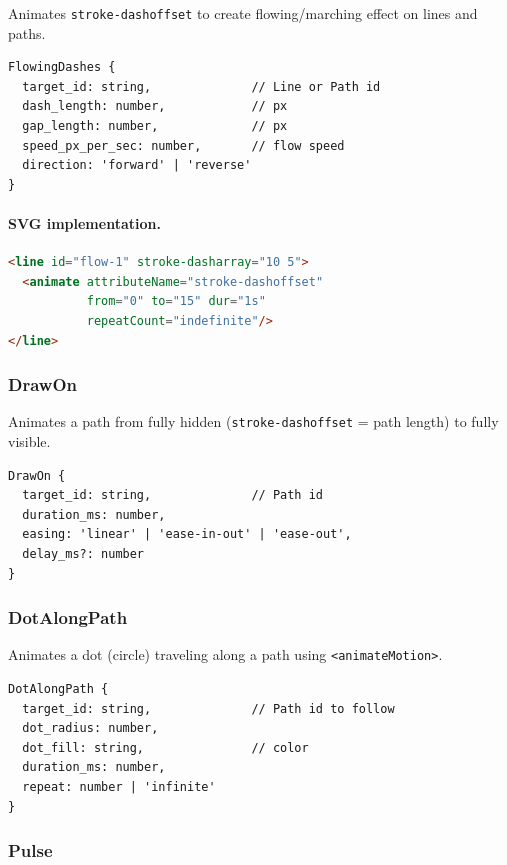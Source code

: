 Animates \texttt{stroke-dashoffset} to create flowing/marching effect on lines and paths.

\begin{Verbatim}[frame=single,fontsize=\small]
FlowingDashes {
  target_id: string,              // Line or Path id
  dash_length: number,            // px
  gap_length: number,             // px
  speed_px_per_sec: number,       // flow speed
  direction: 'forward' | 'reverse'
}
\end{Verbatim}

\paragraph{SVG implementation.}
\begin{lstlisting}[language=html,caption={SVG flowing dashes animation}]
<line id="flow-1" stroke-dasharray="10 5">
  <animate attributeName="stroke-dashoffset"
           from="0" to="15" dur="1s"
           repeatCount="indefinite"/>
</line>
\end{lstlisting}

\subsubsection{DrawOn}

Animates a path from fully hidden (\texttt{stroke-dashoffset} = path length) to fully visible.

\begin{Verbatim}[frame=single,fontsize=\small]
DrawOn {
  target_id: string,              // Path id
  duration_ms: number,
  easing: 'linear' | 'ease-in-out' | 'ease-out',
  delay_ms?: number
}
\end{Verbatim}

\subsubsection{DotAlongPath}

Animates a dot (circle) traveling along a path using \texttt{<animateMotion>}.

\begin{Verbatim}[frame=single,fontsize=\small]
DotAlongPath {
  target_id: string,              // Path id to follow
  dot_radius: number,
  dot_fill: string,               // color
  duration_ms: number,
  repeat: number | 'infinite'
}
\end{Verbatim}

\subsubsection{Pulse}

